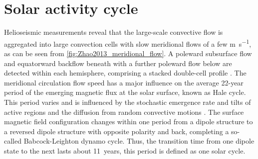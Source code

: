 \section{Solar activity cycle}
\label{sec:solar_activity_cycle}
Helioseismic measurements reveal that the large-scale convective flow is aggregated into large convection cells with slow meridional flows of a few \si{\m\per\s}, as can be seen from \autoref{fig:Zhao2013_meridional_flow}. A poleward subsurface flow and equatorward backflow beneath with a further poleward flow below are detected within each hemisphere, comprising a stacked double-cell profile \citep{Zhao2013}. The meridional circulation flow speed has a major influence on the average 22-year period of the emerging magnetic flux at the solar surface, known as Hale cycle. This period varies and is influenced by the stochastic emergence rate and tilts of active regions and the diffusion from random convective motions \citep{Hathaway2016}. The surface magnetic field configuration changes within one period from a dipole structure to a reversed dipole structure with opposite polarity and back, completing a so-called Babcock-Leighton dynamo cycle. Thus, the transition time from one dipole state to the next lasts about 11~years, this period is defined as one solar cycle.

